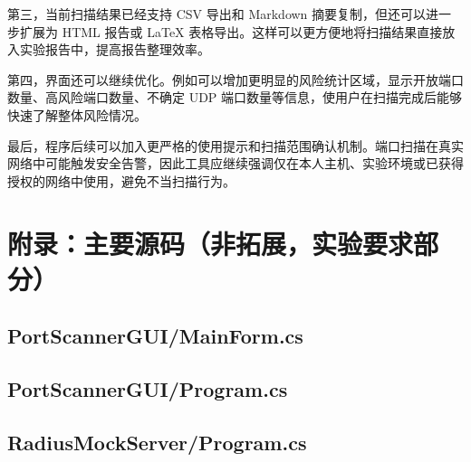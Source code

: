 \documentclass[UTF8,a4paper,12pt]{ctexart}
\begin{document}
第三，当前扫描结果已经支持 CSV 导出和 Markdown 摘要复制，但还可以进一步扩展为 HTML 报告或 LaTeX 表格导出。这样可以更方便地将扫描结果直接放入实验报告中，提高报告整理效率。

第四，界面还可以继续优化。例如可以增加更明显的风险统计区域，显示开放端口数量、高风险端口数量、不确定 UDP 端口数量等信息，使用户在扫描完成后能够快速了解整体风险情况。

最后，程序后续可以加入更严格的使用提示和扫描范围确认机制。端口扫描在真实网络中可能触发安全告警，因此工具应继续强调仅在本人主机、实验环境或已获得授权的网络中使用，避免不当扫描行为。


\newpage
\appendix
\section{附录：主要源码（非拓展，实验要求部分）}

\subsection{PortScannerGUI/MainForm.cs}


\subsection{PortScannerGUI/Program.cs}


\subsection{RadiusMockServer/Program.cs}

\end{document}
